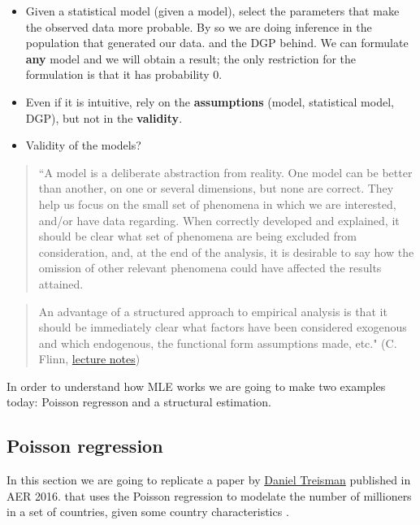 \documentclass[]{book}
\begin{document}
\begin{itemize}
\item
  Given a statistical model (given a model), select the parameters that
  make the observed data more probable. By so we are doing inference in
  the population that generated our data. and the DGP behind. We can
  formulate \textbf{any} model and we will obtain a result; the only
  restriction for the formulation is that it has probability 0.
\item
  Even if it is intuitive, rely on the \textbf{assumptions} (model,
  statistical model, DGP), but not in the \textbf{validity}.
\item
  Validity of the models?
\end{itemize}

\begin{quote}
``A model is a deliberate abstraction from reality. One model can be
better than another, on one or several dimensions, but none are correct.
They help us focus on the small set of phenomena in which we are
interested, and/or have data regarding. When correctly developed and
explained, it should be clear what set of phenomena are being excluded
from consideration, and, at the end of the analysis, it is desirable to
say how the omission of other relevant phenomena could have affected the
results attained.
\end{quote}

\begin{quote}
An advantage of a structured approach to empirical analysis is that it
should be immediately clear what factors have been considered exogenous
and which endogenous, the functional form assumptions made, etc." (C.
Flinn,
\href{http://www.econ.nyu.edu/user/flinnc/courses/CCA-RGSE-2019/search_estimation_notes.pdf}{lecture
notes})
\end{quote}

In order to understand how MLE works we are going to make two examples
today: Poisson regresson and a structural estimation.

\subsection{Poisson regression}\label{poisson-regression}

In this section we are going to replicate a paper by
\href{https://www.danieltreisman.org/}{Daniel Treisman} published in AER
2016. that uses the Poisson regression to modelate the number of
millioners in a set of countries, given some country characteristics
\citep{treisman2016russia}.
\end{document}
